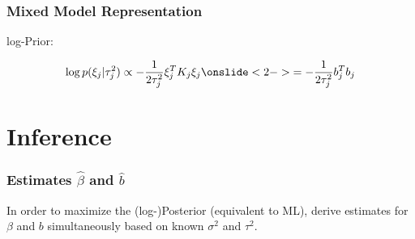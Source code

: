 \documentclass[final]{beamer}
\begin{document}
\begin{frame}
\frametitle{Mixed Model Representation}

\textcolor{beamer@postercolour}{log-Prior: } 

\begin{minipage}[t][4em][t]{\textwidth}
\vspace{-1em}
\begin{overprint}
\begin{align*}
\log p(\xi_j|\tau_j^2)  \propto -\frac{1}{2\tau^2_j} \xi_j^TK_j \xi_j
\onslide<2->{ = -\frac{1}{2\tau_j^2} b_j^T b_j
}
\end{align*}
\end{overprint}
\vspace{-3em}
\end{minipage}

\begin{minipage}[t][10em][t]{\textwidth}


\vspace{2em}

\end{minipage}

\end{frame}

\section{Inference}

\begin{frame}
\frametitle{Estimates $\hat{\beta}$ and $\hat{b}$}
In order to maximize the (log-)Posterior (equivalent to ML), derive estimates for $\beta$ and $b$ simultaneously based on known $\sigma^2$ and $\tau^2$.
\vspace{2em}


\end{frame}
\end{document}
